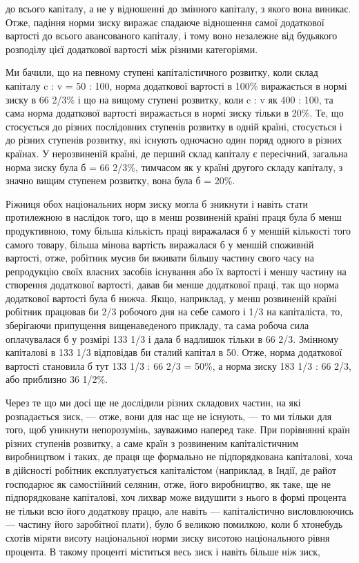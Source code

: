 до всього капіталу, а не у відношенні до змінного капіталу, з
якого вона виникає. Отже, падіння норми зиску виражає спадаюче
відношення самої додаткової вартості до всього авансованого
капіталу, і тому воно незалежне від будьякого розподілу
цієї додаткової вартості між різними категоріями.

Ми бачили, що на певному ступені капіталістичного розвитку,
коли склад капіталу c : v = 50 : 100, норма додаткової вартості
в 100\% виражається в нормі зиску в 66 2/3\% і що на вищому
ступені розвитку, коли c : v як 400 : 100, та сама норма додаткової
вартості виражається в нормі зиску тільки в 20\%. Те, що
стосується до різних послідовних ступенів розвитку в одній
країні, стосується і до різних ступенів розвитку, які існують
одночасно один поряд одного в різних країнах. У нерозвиненій
країні, де перший склад капіталу є пересічний, загальна норма
зиску була б = 66 2/3\%, тимчасом як у країні другого складу капіталу,
з значно вищим ступенем розвитку, вона була б = 20\%.

Ріжниця обох національних норм зиску могла б зникнути і
навіть стати протилежною в наслідок того, що в менш розвиненій
країні праця була б менш продуктивною, тому більша
кількість праці виражалася б у меншій кількості того самого
товару, більша мінова вартість виражалася б у меншій споживній
вартості, отже, робітник мусив би вживати більшу частину
свого часу на репродукцію своїх власних засобів існування або
їх вартості і меншу частину на створення додаткової вартості,
давав би менше додаткової праці, так що норма додаткової
вартості була б нижча. Якщо, наприклад, у менш розвиненій країні
робітник працював би 2/3 робочого дня на себе самого і 1/3 на
капіталіста, то, зберігаючи припущення вищенаведеного прикладу,
та сама робоча сила оплачувалася б у розмірі 133 1/3 і дала б
надлишок тільки в 66 2/3. Змінному капіталові в 133 1/3 відповідав
би сталий капітал в 50. Отже, норма додаткової вартості становила
б тут 133 1/3 : 66 2/3 = 50\%, а норма зиску 183 1/3 : 66 2/3, або
приблизно 36 1/2\%.

Через те що ми досі ще не дослідили різних складових частин,
на які розпадається зиск, — отже, вони для нас ще не існують,
— то ми тільки для того, щоб уникнути непорозумінь,
зауважимо наперед таке. При порівнянні країн різних ступенів
розвитку, а саме країн з розвиненим капіталістичним виробництвом
і таких, де праця ще формально не підпорядкована капіталові,
хоча в дійсності робітник експлуатується капіталістом
(наприклад, в Індії, де райот господарює як самостійний селянин,
отже, його виробництво, як таке, ще не підпорядковане капіталові,
хоч лихвар може видушити з нього в формі процента
не тільки всю його додаткову працю, але навіть — капіталістично
висловлюючись — частину його заробітної плати), було б
великою помилкою, коли б хтонебудь схотів міряти висоту національної
норми зиску висотою національного рівня процента.
В такому проценті міститься весь зиск і навіть більше ніж зиск,
